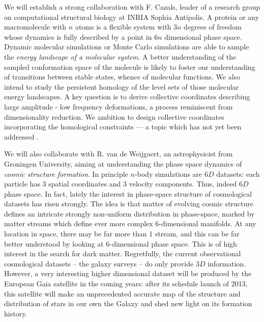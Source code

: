 
We will establish a strong collaboration with F. Cazals, leader of a
research group on computational structural biology at INRIA Sophia
Antipolis. A protein or any macromolecule with $n$ atoms is a flexible
system with $3n$ degrees of freedom whose dynamics is fully described
by a point in $6n$ dimensional phase space. Dynamic molecular
simulations or Monte Carlo simulations are able to sample the {\em energy
landscape of a molecular system}. A better understanding of the
sampled conformation space of the molecule is likely to
foster our understanding of transitions between stable states,
whence of molecular functions.
We also intend to study the persistent homology
of the level sets of those molecular energy landscapes. A key question
 is to derive collective coordinates describing large amplitude -
low frequency deformations, a process reminiscent from dimensionality
reduction. We ambition to design collective coordinates incorporating
the homological constraints --- a topic which has not yet been
addressed \cite{djw-el-2003}. 

We will also collaborate with R. van de Weijgaert, an astrophysicist from
Groningen University, aiming at understanding the  phase space dynamics of
{\em cosmic structure formation}. In principle $n$-body simulations are
$6D$ datasets: each particle has 3 spatial coordinates and 3 velocity components.
Thus, indeed $6D$ phase space. In fact, lately the interest in phase-space structure
of cosmological datasets has risen strongly. The idea is that matter of evolving cosmic
structure defines an intricate strongly non-uniform distribution in phase-space,
marked by matter streams which define ever more complex $6$-dimensional
manifolds. At any location in space, there may be far more than 1 stream, and this
can be far better understood by looking at $6$-dimensional phase space. This is of high
interest in the search for dark matter. Regretfully, the current observational
cosmological datasets -- the galaxy surveys -- do only provide $3D$ information.
However, a very interesting higher dimensional dataset will be produced by
the European Gaia satellite in the coming years: after its schedule launch of 2013, this satellite
will make an unprecedented accurate map of the structure and distribution of
stars in our own the Galaxy and shed new light on its formation
history. 

